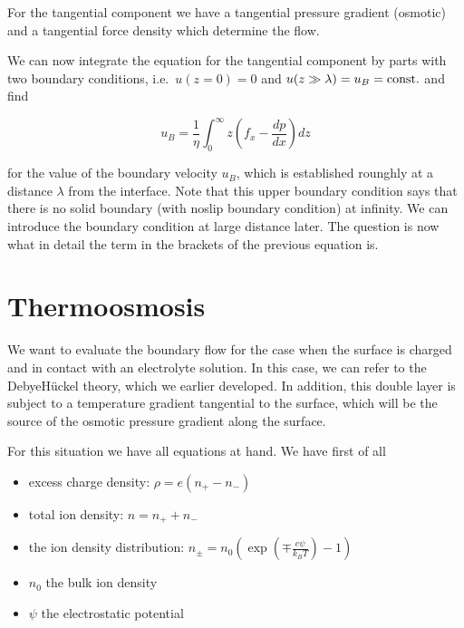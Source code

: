 \documentclass[letterpaper,10pt,english]{sphinxmanual}
\let\sphinxpxdimen\pdfpxdimen\else\newdimen\sphinxpxdimen
\begin{document}
\sphinxAtStartPar
For the tangential component we have a tangential pressure gradient (osmotic) and a tangential force density which determine the flow.

\sphinxAtStartPar
We can now integrate the equation for the tangential component by parts with two boundary conditions, i.e. \(u(z=0)=0\) and \(u(z\gg\lambda)=u_B={\rm const.}\) and find

\sphinxAtStartPar
\begin{equation}
u_B=\frac{1}{\eta}\int_0^{\infty} z\left (f_x-\frac{dp}{dx}\right )dz
\end{equation}

\sphinxAtStartPar
for the value of the boundary velocity \(u_B\), which is established rounghly at a distance \(\lambda\) from the interface. Note that this upper boundary condition says that there is no solid boundary (with no\sphinxhyphen{}slip boundary condition) at infinity. We can introduce the boundary condition at large distance later. The question is now what in detail the term in the brackets of the previous equation is.


\section{Thermo\sphinxhyphen{}osmosis}
\label{\detokenize{notebooks/L18/2_boundary_hydrodynamics:Thermo-osmosis}}
\sphinxAtStartPar
We want to evaluate the boundary flow for the case when the surface is charged and in contact with an electrolyte solution. In this case, we can refer to the Debye\sphinxhyphen{}Hückel theory, which we earlier developed. In addition, this double layer is subject to a temperature gradient tangential to the surface, which will be the source of the osmotic pressure gradient along the surface.

\noindent\sphinxincludegraphics[width=1026\sphinxpxdimen,height=244\sphinxpxdimen]{{charged_surface}.png}

\sphinxAtStartPar
For this situation we have all equations at hand. We have first of all
\begin{itemize}
\item {} 
\sphinxAtStartPar
excess charge density: \(\rho = e (n_+-n_-)\)

\item {} 
\sphinxAtStartPar
total ion density: \(n=n_++n_-\)

\item {} 
\sphinxAtStartPar
the ion density distribution: \(n_{\pm}=n_0(\exp\left (\mp \frac{e\psi}{k_B T}\right )-1)\)

\item {} 
\sphinxAtStartPar
\(n_0\) the bulk ion density

\item {} 
\sphinxAtStartPar
\(\psi\) the electrostatic potential

\end{itemize}
\end{document}
